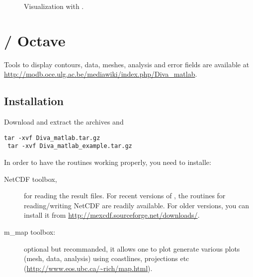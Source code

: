 \begin{figure}[htpb]
\centering
{}

\caption{Visualization with \gnuplot.\label{fig:gnuplotexamples}}
\end{figure}


\section{\matlab / Octave}


Tools to display contours, data, meshes, analysis and error fields are available at \url{http://modb.oce.ulg.ac.be/mediawiki/index.php/Diva_matlab}. 

\subsection{Installation}

Download and extract the archives  and 
\begin{lstlisting}[style=Bash]
 tar -xvf Diva_matlab.tar.gz
 tar -xvf Diva_matlab_example.tar.gz
\end{lstlisting}

In order to have the routines working properly, you need to installe:
\begin{description}
\item[NetCDF toolbox,] for reading the result files. For recent versions of \matlab, the routines for reading/writing NetCDF are readily available. For older versions, you can install it from \url{http://mexcdf.sourceforge.net/downloads/}.
\item[m\_map toolbox:] optional but recommanded, it allows one to plot generate various plots (mesh, data, analysis) using coastlines, projections etc (\url{http://www.eos.ubc.ca/~rich/map.html}). 
\end{description}
    

